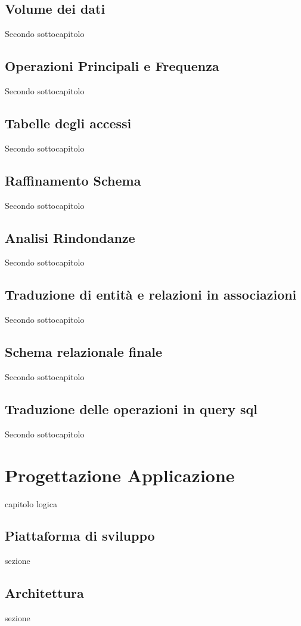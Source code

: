 ﻿\documentclass[a4paper,12pt]{report}
\begin{document}
\section*{Volume dei dati}
Secondo sottocapitolo
\section*{Operazioni Principali e Frequenza}
Secondo sottocapitolo
\section*{Tabelle degli accessi}
Secondo sottocapitolo
\section*{Raffinamento Schema}
Secondo sottocapitolo
\section*{Analisi Rindondanze}
Secondo sottocapitolo
\section*{Traduzione di entità e relazioni in associazioni}
Secondo sottocapitolo
\section*{Schema relazionale finale}
Secondo sottocapitolo
\section*{Traduzione delle operazioni in query sql}
Secondo sottocapitolo


\chapter*{Progettazione Applicazione}
capitolo logica
\section*{Piattaforma di sviluppo}
sezione
\section*{Architettura}
sezione
\end{document}
